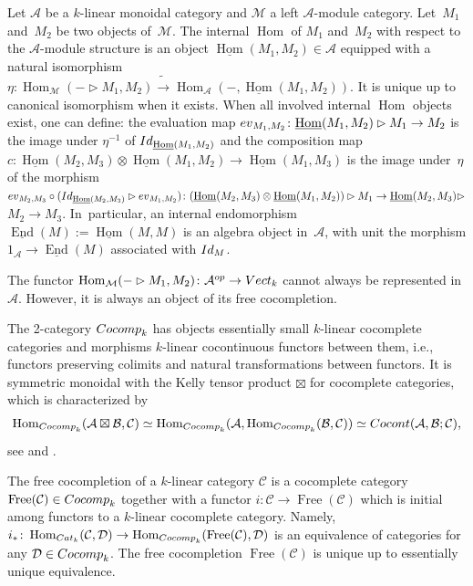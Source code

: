 \documentclass[11pt]{article}
\numberwithin{equation}{section}
\numberwithin{equation}{section}
\newcommand{\Free}{\operatorname{Free}}
\newcommand{\Hom}{\operatorname{Hom}}
\newcommand{\undHom}{\underline{\operatorname{Hom}}}
\newcommand{\undEnd}{\underline{\operatorname{End}}}
\begin{document}
\begin{Definition}\label{algStrOnIntHom}
Let $\mathcal{A}$ be a $k$-linear monoidal category and $\mathcal{M}$ a left $\mathcal{A}$-module category. Let~$M_1$ and~$M_2$ be two objects of~$\mathcal{M}$. The internal $\Hom$ of $M_1$ and~$M_2$ with respect to the $\mathcal{A}$-module structure is an object $\undHom(M_1,M_2)\in \mathcal{A}$
equipped with a natural isomorphism $\eta\colon \Hom_\mathcal{M}(-\rhd M_1,M_2) \tilde{\to} \Hom_\mathcal{A}(-,\undHom(M_1,M_2))$. It is unique up to canonical isomorphism when it exists.
When all involved internal $\Hom$ objects exist, one can define: the eva\-lua\-tion map ${\rm ev}_{M_1,M_2}\colon \undHom(M_1,M_2) \rhd M_1\to M_2$ is the image under $\eta^{-1}$ of ${\rm Id}_{\undHom(M_1,M_2)}$ and the composition map $c\colon \undHom(M_2,M_3) \otimes \undHom(M_1,M_2) \to \undHom(M_1,M_3)$ is the image under~$\eta$ of the morphism ${\rm ev}_{M_2,M_3} \circ ({\rm Id}_{\undHom(M_2,M_3)} \rhd {\rm ev}_{M_1,M_2})\colon (\undHom(M_2,M_3) \otimes \undHom(M_1,M_2))\rhd M_1 \to \undHom(M_2,M_3) \rhd$ $M_2\to M_3$.
In~particular, an internal endomorphism $\undEnd(M) := \undHom(M,M)$ is an algebra object in~$\mathcal{A}$, with unit the morphism $1_\mathcal{A} \to \undEnd(M)$ associated with ${\rm Id}_M$.
\end{Definition}

The functor $\Hom_\mathcal{M}(-\rhd M_1, M_2)\colon\mathcal{A}^{\rm op} \to {\rm Vect}_k$ cannot always be represented in $\mathcal{A}$. However, it is always an object of its free cocompletion.
\begin{Definition}
The 2-category ${\rm Cocomp}_k$ has objects essentially small $k$-linear cocomplete categories and morphisms $k$-linear cocontinuous functors between them, i.e., functors preserving colimits and natural transformations between functors.
It is symmetric monoidal with the Kelly tensor product $\boxtimes$ for cocomplete categories, which is characterized by
\[
\Hom_{{\rm Cocomp}_k}(\mathcal{A} \boxtimes \mathcal{B},\mathcal{C}) \simeq \Hom_{{\rm Cocomp}_k}(\mathcal{A},\Hom_{{\rm Cocomp}_k}(\mathcal{B},\mathcal{C})) \simeq {\rm Cocont}(\mathcal{A},\mathcal{B};\mathcal{C}),
\]
see \cite[Section~6.5]{Kelly2} and \cite[Theorem~2.45]{Ramos}.

The free cocompletion of a $k$-linear category $\mathcal{C}$ is a cocomplete category $\Free(\mathcal{C}) \in {\rm Cocomp}_k$ together with a functor $i\colon \mathcal{C} \to \Free(\mathcal{C})$ which is initial among functors to a $k$-linear cocomplete category. Namely, $i_*\colon \Hom_{{\rm Cat}_k}(\mathcal{C},\mathcal{D}) \to \Hom_{{\rm Cocomp}_k}(\Free(\mathcal{C}),\mathcal{D})$ is an equivalence of categories for any $\mathcal{D}\in {\rm Cocomp}_k$. The free cocompletion $\Free(\mathcal{C})$ is unique up to essentially unique equivalence.
\end{Definition}
\end{document}
